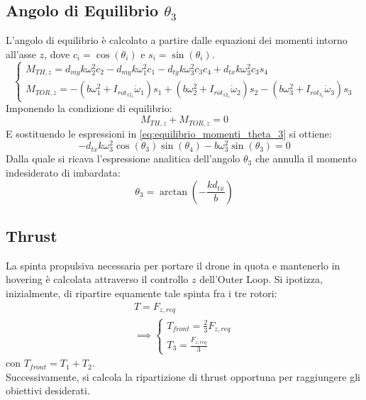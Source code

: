 \subsection{Angolo di Equilibrio \texorpdfstring{$\theta_{3}$}{theta 3}}
L'angolo di equilibrio è calcolato a partire dalle equazioni dei momenti intorno all'asse $z$, dove $c_i = \cos(\theta_i)$ e $s_i = \sin(\theta_i)$.
\begin{equation}
    \begin{cases}
        M_{TH,z} = d_{my} k \omega_{2}^2 c_2 - d_{my} k \omega_{1}^2 c_1 - d_{ty} k \omega_{3}^2 c_3 c_4 + d_{tx} k \omega_{3}^2 c_3 s_4 \\
        M_{TOR,z} = -(b \omega_{1}^2 + I_{rot_{12_{z}}} \dot{\omega}_{1}) s_1 + (b \omega_{2}^2 + I_{rot_{12_{z}}} \dot{\omega}_{2}) s_2 - (b \omega_{3}^2 + I_{rot_{3_{z}}} \dot{\omega}_{3}) s_3
    \end{cases}
    \label{eq:equilibrio_momenti_theta_3}
\end{equation}
Imponendo la condizione di equilibrio:
\begin{equation}
    M_{TH,z} + M_{TOR,z} = 0
\end{equation}
E sostituendo le espressioni in \ref{eq:equilibrio_momenti_theta_3} si ottiene:
\begin{equation}
    - d_{tx} k \omega_{3}^2 \cos(\theta_{3}) \sin(\theta_{4}) - b \omega_{3}^2 \sin(\theta_{3}) = 0
\end{equation}
Dalla quale si ricava l'espressione analitica dell'angolo $\theta_3$ che annulla il momento indesiderato di imbardata:
\begin{equation}
    \theta_{3} = \arctan\left(-\frac{k d_{tx}}{b}\right)
\end{equation}

\subsection{Thrust}
La spinta propulsiva necessaria per portare il drone in quota e mantenerlo in hovering è calcolata attraverso 
il controllo $z$ dell'Outer Loop. Si ipotizza, inizialmente, di ripartire equamente tale spinta fra i tre rotori:
\begin{equation}
    \begin{matrix}
        T = F_{z,req}\\
        \implies 
        \begin{cases}
            T_{front} = \frac{2}{3}F_{z,req}\\
            T_{3} = \frac{F_{z,req}}{3}
        \end{cases}        
    \end{matrix}    
\end{equation}
con $T_{front} = T_1 + T_2$.\\
Successivamente, si calcola la ripartizione di thrust opportuna per raggiungere gli obiettivi desiderati. 

